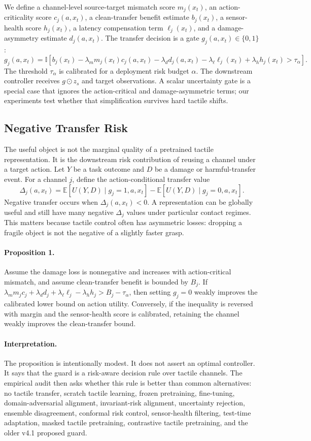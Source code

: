 \documentclass{article}
\begin{document}
We define a channel-level source-target mismatch score $m_j(x_t)$, an action-criticality score $c_j(a,x_t)$, a clean-transfer benefit estimate $b_j(x_t)$, a sensor-health score $h_j(x_t)$, a latency compensation term $\ell_j(x_t)$, and a damage-asymmetry estimate $d_j(a,x_t)$. The transfer decision is a gate $g_j(a,x_t) \in \{0,1\}$:
\[
g_j(a,x_t)=\mathbb{I}\left[
b_j(x_t)-\lambda_m m_j(x_t)c_j(a,x_t)-\lambda_d d_j(a,x_t)
-\lambda_\ell \ell_j(x_t)+\lambda_h h_j(x_t)>\tau_\alpha
\right].
\]
The threshold $\tau_\alpha$ is calibrated for a deployment risk budget $\alpha$. The downstream controller receives $g \odot z_s$ and target observations. A scalar uncertainty gate is a special case that ignores the action-critical and damage-asymmetric terms; our experiments test whether that simplification survives hard tactile shifts.

\subsection{Negative Transfer Risk}
The useful object is not the marginal quality of a pretrained tactile representation. It is the downstream risk contribution of reusing a channel under a target action. Let $Y$ be a task outcome and $D$ be a damage or harmful-transfer event. For a channel $j$, define the action-conditional transfer value
\[
\Delta_j(a,x_t)=
\mathbb{E}[U(Y,D)\mid g_j=1,a,x_t]-
\mathbb{E}[U(Y,D)\mid g_j=0,a,x_t].
\]
Negative transfer occurs when $\Delta_j(a,x_t)<0$. A representation can be globally useful and still have many negative $\Delta_j$ values under particular contact regimes. This matters because tactile control often has asymmetric losses: dropping a fragile object is not the negative of a slightly faster grasp.

\paragraph{Proposition 1.}
Assume the damage loss is nonnegative and increases with action-critical mismatch, and assume clean-transfer benefit is bounded by $B_j$. If $\lambda_m m_j c_j+\lambda_d d_j+\lambda_\ell \ell_j-\lambda_h h_j > B_j-\tau_\alpha$, then setting $g_j=0$ weakly improves the calibrated lower bound on action utility. Conversely, if the inequality is reversed with margin and the sensor-health score is calibrated, retaining the channel weakly improves the clean-transfer bound.

\paragraph{Interpretation.}
The proposition is intentionally modest. It does not assert an optimal controller. It says that the guard is a risk-aware decision rule over tactile channels. The empirical audit then asks whether this rule is better than common alternatives: no tactile transfer, scratch tactile learning, frozen pretraining, fine-tuning, domain-adversarial alignment, invariant-risk alignment, uncertainty rejection, ensemble disagreement, conformal risk control, sensor-health filtering, test-time adaptation, masked tactile pretraining, contrastive tactile pretraining, and the older v4.1 proposed guard.
\end{document}
